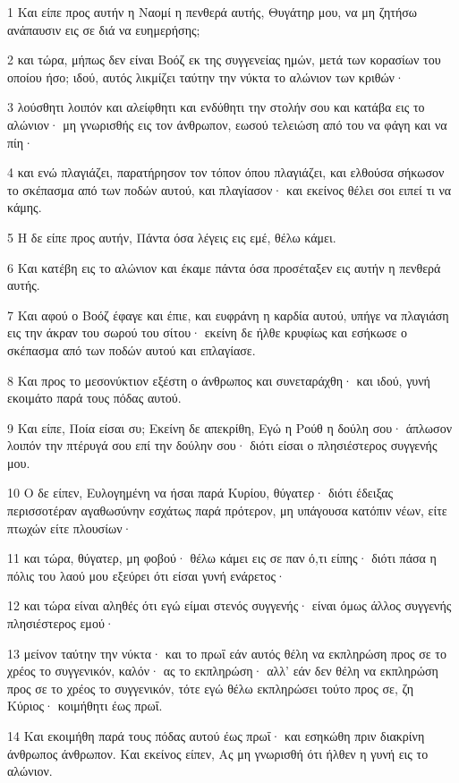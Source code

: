 \par 1 Και είπε προς αυτήν η Ναομί η πενθερά αυτής, Θυγάτηρ μου, να μη ζητήσω ανάπαυσιν εις σε διά να ευημερήσης;
\par 2 και τώρα, μήπως δεν είναι Βοόζ εκ της συγγενείας ημών, μετά των κορασίων του οποίου ήσο; ιδού, αυτός λικμίζει ταύτην την νύκτα το αλώνιον των κριθών·
\par 3 λούσθητι λοιπόν και αλείφθητι και ενδύθητι την στολήν σου και κατάβα εις το αλώνιον· μη γνωρισθής εις τον άνθρωπον, εωσού τελειώση από του να φάγη και να πίη·
\par 4 και ενώ πλαγιάζει, παρατήρησον τον τόπον όπου πλαγιάζει, και ελθούσα σήκωσον το σκέπασμα από των ποδών αυτού, και πλαγίασον· και εκείνος θέλει σοι ειπεί τι να κάμης.
\par 5 Η δε είπε προς αυτήν, Πάντα όσα λέγεις εις εμέ, θέλω κάμει.
\par 6 Και κατέβη εις το αλώνιον και έκαμε πάντα όσα προσέταξεν εις αυτήν η πενθερά αυτής.
\par 7 Και αφού ο Βοόζ έφαγε και έπιε, και ευφράνη η καρδία αυτού, υπήγε να πλαγιάση εις την άκραν του σωρού του σίτου· εκείνη δε ήλθε κρυφίως και εσήκωσε ο σκέπασμα από των ποδών αυτού και επλαγίασε.
\par 8 Και προς το μεσονύκτιον εξέστη ο άνθρωπος και συνεταράχθη· και ιδού, γυνή εκοιμάτο παρά τους πόδας αυτού.
\par 9 Και είπε, Ποία είσαι συ; Εκείνη δε απεκρίθη, Εγώ η Ρούθ η δούλη σου· άπλωσον λοιπόν την πτέρυγά σου επί την δούλην σου· διότι είσαι ο πλησιέστερος συγγενής μου.
\par 10 Ο δε είπεν, Ευλογημένη να ήσαι παρά Κυρίου, θύγατερ· διότι έδειξας περισσοτέραν αγαθωσύνην εσχάτως παρά πρότερον, μη υπάγουσα κατόπιν νέων, είτε πτωχών είτε πλουσίων·
\par 11 και τώρα, θύγατερ, μη φοβού· θέλω κάμει εις σε παν ό,τι είπης· διότι πάσα η πόλις του λαού μου εξεύρει ότι είσαι γυνή ενάρετος·
\par 12 και τώρα είναι αληθές ότι εγώ είμαι στενός συγγενής· είναι όμως άλλος συγγενής πλησιέστερος εμού·
\par 13 μείνον ταύτην την νύκτα· και το πρωΐ εάν αυτός θέλη να εκπληρώση προς σε το χρέος το συγγενικόν, καλόν· ας το εκπληρώση· αλλ' εάν δεν θέλη να εκπληρώση προς σε το χρέος το συγγενικόν, τότε εγώ θέλω εκπληρώσει τούτο προς σε, ζη Κύριος· κοιμήθητι έως πρωΐ.
\par 14 Και εκοιμήθη παρά τους πόδας αυτού έως πρωΐ· και εσηκώθη πριν διακρίνη άνθρωπος άνθρωπον. Και εκείνος είπεν, Ας μη γνωρισθή ότι ήλθεν η γυνή εις το αλώνιον.
